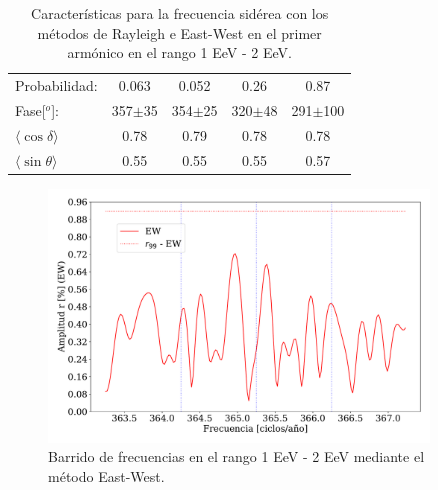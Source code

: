 \begin{table}[H]
\begin{small}
\begin{center}
\begin{tabular}[c]{l|c|c|c||c|}
\multicolumn{1}{|l|}{Probabilidad:           }  & 0.063	                 & 0.052	                        & 0.26                        & 0.87          \\
\multicolumn{1}{|l|}{Fase[$^o$]:             }  & 357$\pm$35             & 354$\pm$25                   & 320$\pm$48                 & 291$\pm$100      \\\hline
\multicolumn{1}{|l|}{$\langle\cos\delta\rangle$}&{0.78}& 0.79 &{0.78}                        & 0.78       \\        
\multicolumn{1}{|l|}{$\langle\sin\theta\rangle$}&{0.55}& 0.55 &{0.55}                        & 0.57       \\ \hline       
\end{tabular}
            \end{center}
        \end{small}
        \vspace*{-0.21 cm}
        \caption{Características para la frecuencia sidérea con los métodos de Rayleigh  e East-West en el primer armónico en el rango 1 EeV - 2 EeV.}
        \label{tab:siderea_3}
    \end{table}



    \begin{figure}[H]
        \begin{small}
            \begin{center}
                \vspace*{-0.21 cm}
                \includegraphics[width=0.9\textwidth]{plot_bin_3_barrido_v3_EW.pdf}
                \vspace*{-1 cm}
            \end{center}
            \caption{Barrido de frecuencias en el rango 1 EeV - 2 EeV mediante el método East-West.}
            \label{fig:tercer_barrido}
        \end{small}
    \end{figure}    


